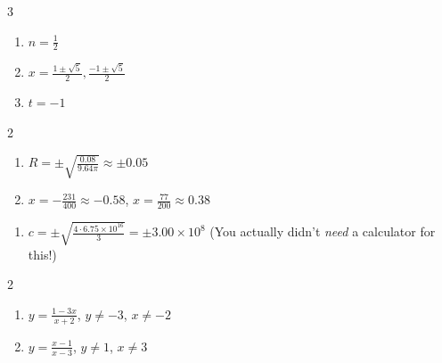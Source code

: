 \documentclass{ximera}
\begin{document}
\begin{multicols}{3}
\begin{enumerate}
\setcounter{enumi}{\value{HW}}

\item $n = \frac{1}{2}$
\item $x = \frac{1 \pm \sqrt{5}}{2}, \frac{-1 \pm \sqrt{5}}{2}$
\item $t = -1$

\setcounter{HW}{\value{enumi}}
\end{enumerate}
\end{multicols}


\begin{multicols}{2}
\begin{enumerate}
\setcounter{enumi}{\value{HW}}


\item $R = \pm \sqrt{\frac{0.08}{9.64 \pi}} \approx \pm 0.05$ 
\item $x = -\frac{231}{400} \approx -0.58$, $x = \frac{77}{200} \approx 0.38$ 


\setcounter{HW}{\value{enumi}}
\end{enumerate}
\end{multicols}

\begin{enumerate}
\setcounter{enumi}{\value{HW}}
\item $c = \pm \sqrt{\frac{4 \cdot 6.75 \times 10^{16}}{3}} = \pm 3.00 \times 10^{8}$ (You actually didn't 
\textit{need} a calculator for this!)

\setcounter{HW}{\value{enumi}}
\end{enumerate}


\begin{multicols}{2}
\begin{enumerate}
\setcounter{enumi}{\value{HW}}


\item $y = \frac{1 - 3x}{x+2}$, $y \neq -3$, $x \neq -2$

\item $y = \frac{x-1}{x-3}$, $y \neq 1$, $x \neq 3$

\setcounter{HW}{\value{enumi}}
\end{enumerate}
\end{multicols}
\end{document}
